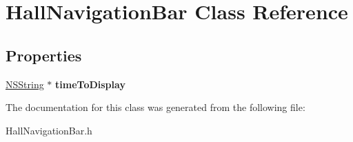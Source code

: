 \hypertarget{interface_hall_navigation_bar}{
\section{HallNavigationBar Class Reference}
\label{interface_hall_navigation_bar}
}
\subsection*{Properties}
\begin{DoxyCompactItemize}
\item 
\hypertarget{interface_hall_navigation_bar_a984ee16d7024797724f3991dde1fec49}{
\hyperlink{class_n_s_string}{NSString} $\ast$ {\bfseries timeToDisplay}}
\label{interface_hall_navigation_bar_a984ee16d7024797724f3991dde1fec49}

\end{DoxyCompactItemize}


The documentation for this class was generated from the following file:\begin{DoxyCompactItemize}
\item 
HallNavigationBar.h\end{DoxyCompactItemize}

